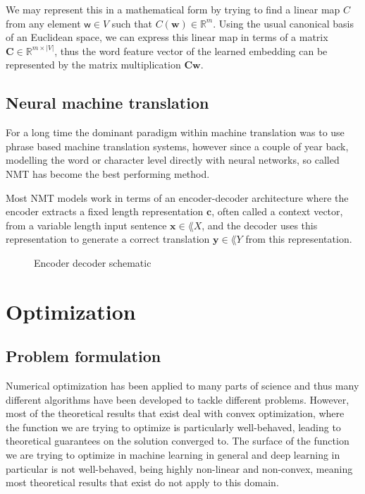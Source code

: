 We may represent this in a mathematical form by trying to find a linear map $C$
from any element $\mathsf{w} \in V$ such that $C(\mathbf{w}) \in \mathbb{R}^m$.
Using the usual canonical basis of an Euclidean space, we can express this
linear map in terms of a matrix $\bm{C} \in \mathbb{R}^{m \times |V|}$, thus the
word feature vector of the learned embedding can be represented by the matrix
multiplication $\bm{C}\bm{w}$.

\subsection{Neural machine translation}
For a long time the dominant paradigm within machine translation was to use
phrase based machine translation systems\cite{Koehn:2003:SPT:1073445.1073462,
  Koehn:2007:MOS:1557769.1557821}, however since a couple of year back,
modelling the word or character level directly with neural networks, so called
NMT has become the best performing method\cite{wolk_neural-based_2015, wu_googles_2016}.

Most NMT models work in terms of an encoder-decoder architecture where the
encoder extracts a fixed length representation $\bm{c}$, often called a context
vector, from a variable length input sentence $\bm{x} \in \lang{X}$, and the
decoder uses this representation to generate a correct translation $\bm{y} \in
\lang{Y}$ from this representation\cite{cho_properties_2014}.

\begin{figure}[H]
    \caption{Encoder decoder schematic}
  \label{fig:encoder_decoder}
\end{figure}

\section{Optimization}

\subsection{Problem formulation}

Numerical optimization has been applied to many parts of science and thus many
different algorithms have been developed to tackle different problems. However,
most of the theoretical results that exist deal with convex optimization, where
the function we are trying to optimize is particularly well-behaved, leading to
theoretical guarantees on the solution converged to. The surface of the function
we are trying to optimize in machine learning in general and deep learning in
particular is not well-behaved, being highly non-linear and non-convex, meaning
most theoretical results that exist do not apply to this domain\cite{choromanska_loss_2014}.


